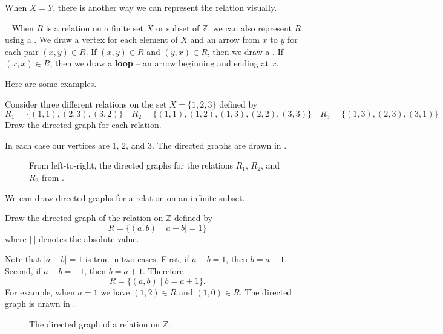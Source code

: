 When $X=Y$, there is another way we can represent the relation visually.

\begin{defn}
\label{defn_draw_relations_directed_graph}
~
    When $R$ is a relation on a finite set $X$ or subset of $\mathbb{Z}$, we can also represent $R$ using a .  We draw a vertex for each element of $X$ and an arrow from $x$ to $y$ for each pair $(x,y) \in R$.  If $(x,y) \in R$ and $(y,x) \in R$, then we draw a .  If $(x,x) \in R$, then we draw a \textbf{loop} -- an arrow beginning and ending at $x$.
\end{defn}

Here are some examples.

\begin{exam}
\label{exam_directed_graph_relation}
    Consider three different relations on the set $X =\{1,2,3\}$ defined by 
       $$R_1 = \{(1,1), (2,3), (3,2)\} \quad R_2 = \{(1,1), (1,2), (1,3), (2,2), (3,3)\} \quad R_3 = \{ (1,3), (2,3),(3,1)\}$$
    Draw the directed graph for each relation.
        \begin{soln}
            In each case our vertices are 1, 2, and 3.  The directed graphs are drawn in .

            \begin{figure}[hbtp]
                \centering
                
                \caption{From left-to-right, the directed graphs for the relations $R_1$, $R_2$, and $R_3$ from .}
                \label{fig_directed_graph_three_relations}
            \end{figure}
        \end{soln}
\end{exam}

We can draw directed graphs for a relation on an infinite subset.

\begin{exam}
\label{exam_digraph_rel_infinite}
    Draw the directed graph of the relation on $\mathbb{Z}$ defined by 
        $$R= \{ (a,b) \mid |a-b|=1\}$$
    where $|~|$ denotes the absolute value.
        \begin{soln}
            Note that $|a-b|=1$ is true in two cases.  First, if $a-b=1$, then $b=a-1$.  Second, if $a-b=-1$, then $b=a+1$.  Therefore 
                $$R = \{(a,b) \mid b = a \pm 1\}.$$  
            For example, when $a=1$ we have $(1,2) \in R$ and $(1,0)\in R$.  The directed graph is drawn in .
        \end{soln}

        \begin{figure}[htbp]
            \centering
              
            \caption{The directed graph of a relation on $\mathbb{Z}$.}
            \label{fig_digraph_rel_infinite}
        \end{figure}
\end{exam}


